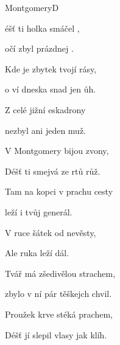 \begin{song}{Montgomery}{D}{}

\begin{SBVerse}

éšť ti holka smáčel ,

 očí zbyl prázdnej .

Kde je zbytek tvojí rásy,

o ví dneska snad jen ůh.

\end{SBVerse}

\begin{SBChorus}

Z celé jižní eskadrony

nezbyl ani jeden muž.

V Montgomery bijou zvony,

Déšť ti smejvá ze rtů růž.

\end{SBChorus}

\begin{SBVerse}

Tam na kopci v prachu cesty

leží i tvůj generál.

V ruce šátek od nevěsty,

Ale ruka leží dál.

\end{SBVerse}

\begin{SBChorus}

\end{SBChorus}

\begin{SBVerse}

Tvář má zšedivělou strachem,

zbylo v ní pár těškejch chvil.

Proužek krve stéká prachem,

Déšť jí slepil vlasy jak klíh.

\end{SBVerse}

\begin{SBChorus}

\end{SBChorus}

\end{song}

\clearpage
